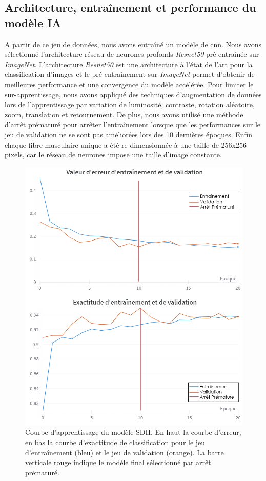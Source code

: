\subsection{Architecture, entraînement et performance du modèle IA}
A partir de ce jeu de données, nous avons entraîné un modèle de \gls{cnn}. Nous avons sélectionné l'architecture réseau de neurones profonds \textit{Resnet50} pré-entraînée sur \textit{ImageNet}. L'architecture \textit{Resnet50} est une architecture à l'état de l'art pour la classification d'images et le pré-entraînement sur \textit{ImageNet} permet d'obtenir de meilleures performance et une convergence du modèle accélérée. Pour limiter le sur-apprentissage, nous avons appliqué des techniques d'augmentation de données lors de l'apprentissage par variation de luminosité, contraste, rotation aléatoire, zoom, translation et retournement. De plus, nous avons utilisé une méthode d'arrêt prématuré pour arrêter l'entraînement lorsque que les performances sur le jeu de validation ne se sont pas améliorées lors des 10 dernières époques. Enfin chaque fibre musculaire unique a été re-dimensionnée à une taille de 256x256 pixels, car le réseau de neurones impose une taille d'image constante.
\begin{figure}[htbp]
 \centering
 \includegraphics[width=1\textwidth]{figures/training_sdh.png}
 \caption[Courbe d'apprentissage du modèle SDH]{Courbe d'apprentissage du modèle SDH. En haut la courbe d'erreur, en bas la courbe d'exactitude de classification pour le jeu d'entraînement (bleu) et le jeu de validation (orange). La barre verticale rouge indique le modèle final sélectionné par arrêt prématuré.}
 \label{fig:sdh_train}
\end{figure}

